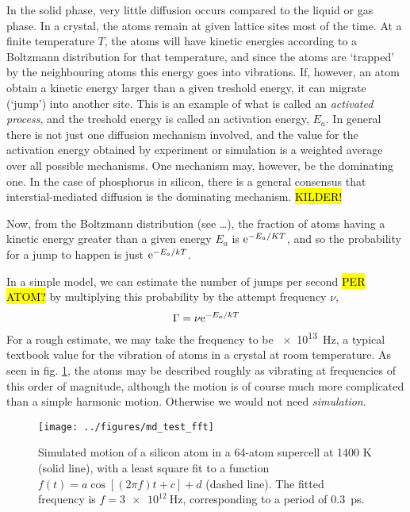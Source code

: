 \documentclass[11pt,bibliography=totoc,index=totoc]{scrbook}   %
\newcommand{\comment}[1]{\hl{#1}}
\begin{document}
In the solid phase, very little diffusion occurs compared to the liquid or gas phase. 
In a crystal, the atoms remain at given lattice sites most of the time.
At a finite temperature $T$, the atoms will have kinetic energies according to a Boltzmann distribution for that temperature,
and since the atoms are `trapped' by the neighbouring atoms this energy goes into vibrations. 
If, however, an atom obtain a kinetic energy larger than a given treshold energy, it can migrate (`jump') into another site.
This is an example of what is called an \emph{activated process}, and the treshold energy is called an activation energy, $E_a$.
In general there is not just one diffusion mechanism involved, and the value for the activation energy obtained by experiment or simulation is a weighted average over all possible mechanisms.
One mechanism may, however, be the dominating one. In the case of phosphorus in silicon, there is a general consensus that interstial-mediated diffusion is the dominating mechanism. \comment{KILDER!}

Now, from the Boltzmann distribution (see \ldots), the fraction of atoms having a kinetic energy greater than a given energy $E_a$ is $\mathrm{e}^{-E_a/KT}$, and so the probability for a jump to happen is just $\mathrm{e}^{-E_a/kT}$. 

In a simple model, we can estimate the number of jumps per second \comment{PER ATOM?} by multiplying this probability by the attempt frequency $\nu$,
\begin{equation}
  \Gamma = \nu \mathrm{e}^{-E_a/kT}
  \label{eq:jumpfreq-est}
\end{equation}
For a rough estimate, we may take the frequency to be \SI{e13}{\hertz}, a typical textbook value for the vibration of atoms in a crystal at room temperature.
As seen in fig. \ref{fig:simple-vibration}, the atoms may be described roughly as vibrating at frequencies of this order of magnitude, although the motion is of course much more complicated than a simple harmonic motion. Otherwise we would not need \emph{simulation}.

\begin{figure}[htbp]
  \begin{center}
    \texttt{[image: ../figures/md\_test\_fft]}
  \end{center}
  \caption{
    Simulated motion of a silicon atom in a 64-atom supercell at 1400 K (solid line), 
    with a least square fit to a function $f(t) = a \cos[(2\pi f)t + c] + d$ (dashed line). 
    The fitted frequency is $f=\SI{3e12}{\hertz}$, corresponding to a period of 0.3~ps.
  }
  \label{fig:simple-vibration}
\end{figure}
\end{document}
